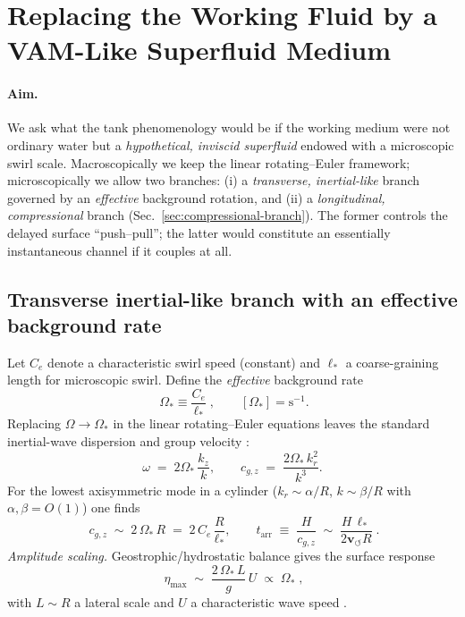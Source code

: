 \documentclass[12pt]{article}
\begin{document}
\section{Replacing the Working Fluid by a VAM-Like Superfluid Medium}
\label{sec:aether-medium}

\paragraph{Aim.}
We ask what the tank phenomenology would be if the working medium were not ordinary water but a \emph{hypothetical, inviscid superfluid} endowed with a microscopic swirl scale. Macroscopically we keep the linear rotating–Euler framework; microscopically we allow two branches: (i) a \emph{transverse, inertial-like} branch governed by an \emph{effective} background rotation, and (ii) a \emph{longitudinal, compressional} branch (Sec.~\ref{sec:compressional-branch}). The former controls the delayed surface ``push--pull''; the latter would constitute an essentially instantaneous channel if it couples at all.

\subsection{Transverse inertial-like branch with an effective background rate}
\label{sec:aether-transverse}
Let $C_e$ denote a characteristic swirl speed (constant) and $\ell_*$ a coarse-graining length for microscopic swirl. Define the \emph{effective} background rate
\begin{equation}
\boxed{\;\Omega_* \equiv \frac{C_e}{\ell_*}\;,}
\qquad [\Omega_*]=\mathrm{s^{-1}}.
\end{equation}
Replacing $\Omega\to\Omega_*$ in the linear rotating–Euler equations leaves the standard inertial-wave dispersion and group velocity \cite{Greenspan1968,Batchelor1967,Vallis2017}:
\begin{equation}
\omega \;=\; 2\Omega_*\,\frac{k_z}{k},
\qquad
c_{g,z} \;=\; \frac{2\Omega_*\,k_r^2}{k^3}.
\label{eq:disp-aether}
\end{equation}
For the lowest axisymmetric mode in a cylinder ($k_r\!\sim\!\alpha/R$, $k\!\sim\!\beta/R$ with $\alpha,\beta=O(1)$) one finds
\begin{equation}
\boxed{\;
c_{g,z}\;\sim\;2\,\Omega_*\,R
\;=\; 2\,C_e\,\frac{R}{\ell_*},
\qquad
t_{\mathrm{arr}}\;\equiv\;\frac{H}{c_{g,z}}\;\sim\;\frac{H\,\ell_*}{2 \mathbf{v}_{\scriptscriptstyle\boldsymbol{\circlearrowleft}} R}\;.
}
\label{eq:arrive-aether}
\end{equation}
\emph{Amplitude scaling.} Geostrophic/hydrostatic balance gives the surface response
\begin{equation}
\boxed{\;\eta_{\max}\;\sim\;\frac{2\,\Omega_*\,L}{g}\,U\;\propto\;\Omega_*\;,}
\label{eq:eta-aether}
\end{equation}
with $L\!\sim\!R$ a lateral scale and $U$ a characteristic wave speed \cite{Batchelor1967,Vallis2017}.
\end{document}
